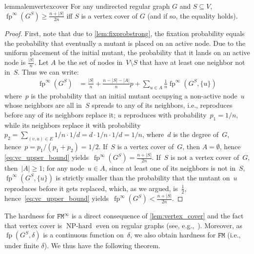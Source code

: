 \documentclass[letterpaper]{article}
\newcommand{\fp}{\operatorname{fp}}
\newcommand{\NodeActivationMoran}{\texttt{FM}}
\newcommand{\NodeActivationMoranStrong}{\texttt{FM}^{\infty}}
\newcommand{\FitAdv}{\delta}
\newcommand{\NPH}{\operatorname{NP-hard}}
\begin{document}
\begin{restatable}{lemma}{lemvertexcover}\label{lem:vertex_cover}
For any undirected regular graph $G$ and $S\subseteq V$, $\fp^{\infty}(G^{S})\geq\frac{n+|S|}{2n}$ iff $S$ is a vertex cover of $G$ (and if so, the equality holds).
\end{restatable}

\begin{proof}
First, note that due to \cref{lem:fixprobstrong}, the fixation probability equals the probability that eventually a mutant is placed on an active node. Due to the uniform placement of the initial mutant, the probability that it lands on an active node is $\frac{|S|}{n}$.
Let $A$ be the set of nodes in~$V\setminus S$ that have at least one neighbor not in~$S$.
Thus we can write:
\begin{align}
\fp^{\infty}(G^{S}) &= {\textstyle \frac{|S|}{n} \!+\! \frac{n-|S|-|A|}{n}p} \!+\! \sum_{u\in A}{\textstyle \frac{1}{n}} \fp^{\infty}(G^S\!, \{u\})
\label{eq:vc_upper_bound}
\end{align}
where~$p$ is the probability that an initial mutant occupying a non-active node~$u$ whose neighbors are all in~$S$ spreads to any of its neighbors, i.e., reproduces before any of its neighbors replace it; $u$ reproduces with probability~$p_1 = 1/n$, while its neighbors replace it with probability $p_2 = \sum_{(v,u)\in E} 1/n\cdot 1/d = d \cdot 1/n\cdot 1/d = 1/n$, where~$d$ is the degree of~$G$, hence~$p = p_1/(p_1+p_2) = 1/2$.
If~$S$ is a vertex cover of~$G$, then $A = \emptyset$, hence \cref{eq:vc_upper_bound} yields~$\fp^{\infty}(G^{S}) = \frac{n+|S|}{2n}$.
If~$S$ is not a vertex cover of~$G$, then~$|A|\geq 1$; for any node~$u \in A$, since at least one of its neighbors is not in~$S$, $\fp^{\infty}(G^S, \{u\})$ is strictly smaller than the probability that the mutant on~$u$ reproduces before it gets replaced, which, as we argued, is~$\frac{1}{2}$, hence~\cref{eq:vc_upper_bound} yields~$\fp^{\infty}(G^{S})<\frac{n+|S|}{2n}$. %
\end{proof}

The hardness for $\NodeActivationMoranStrong$  is a direct consequence of \cref{lem:vertex_cover} and the fact that vertex cover is $\NPH$ even on regular graphs (see, e.g.,~\cite{Feige2003}). Moreover, as $\fp(G^S, \FitAdv)$ is a continuous function on~$\FitAdv$, we also obtain hardness for $\NodeActivationMoran$ (i.e., under finite $\FitAdv$).
We thus have the following theorem.
\end{document}
